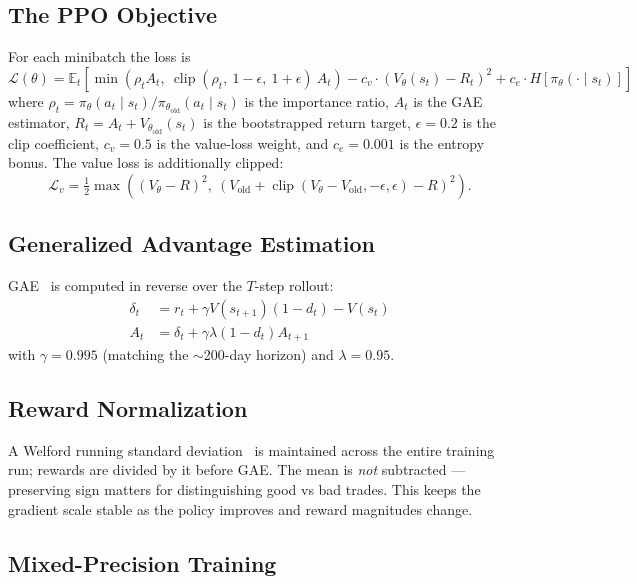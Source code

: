 \documentclass[11pt,a4paper]{article}
\begin{document}
\subsection{The PPO Objective}

For each minibatch the loss is
\begin{equation}
\mathcal{L}(\theta) = \mathbb{E}_t \left[
\min(\rho_t A_t,\ \operatorname{clip}(\rho_t,\ 1-\epsilon,\ 1+\epsilon)\ A_t)
- c_v \cdot (V_\theta(s_t) - R_t)^2
+ c_e \cdot H[\pi_\theta(\cdot \mid s_t)]
\right]
\label{eq:ppo}
\end{equation}
where $\rho_t = \pi_\theta(a_t \mid s_t) / \pi_{\theta_{\text{old}}}(a_t \mid s_t)$
is the importance ratio, $A_t$ is the GAE estimator, $R_t = A_t + V_{\theta_{\text{old}}}(s_t)$
is the bootstrapped return target, $\epsilon = 0.2$ is the clip coefficient,
$c_v = 0.5$ is the value-loss weight, and $c_e = 0.001$ is the entropy bonus. The
value loss is additionally clipped:
\[ \mathcal{L}_v = \tfrac{1}{2} \max\left( (V_\theta - R)^2,\ (V_{\text{old}} +
\operatorname{clip}(V_\theta - V_{\text{old}}, -\epsilon, \epsilon) - R)^2 \right). \]

\subsection{Generalized Advantage Estimation}

GAE~\cite{schulman2016gae} is computed in reverse over the $T$-step rollout:
\begin{align}
\delta_t &= r_t + \gamma V(s_{t+1}) (1 - d_t) - V(s_t) \\
A_t &= \delta_t + \gamma \lambda (1 - d_t) A_{t+1}
\end{align}
with $\gamma = 0.995$ (matching the $\sim$200-day horizon) and $\lambda = 0.95$.

\subsection{Reward Normalization}

A Welford running standard deviation~\cite{welford1962} is maintained across the
entire training run; rewards are divided by it before GAE. The mean is
\emph{not} subtracted --- preserving sign matters for distinguishing good vs bad
trades. This keeps the gradient scale stable as the policy improves and reward
magnitudes change.

\subsection{Mixed-Precision Training}
\end{document}

